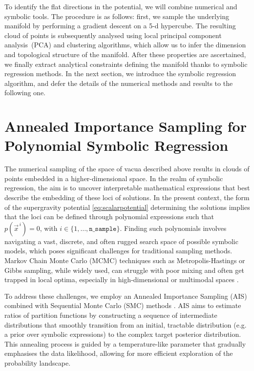 \documentclass[11pt,a4paper]{article}
\begin{document}
To identify the flat directions in the potential, we will combine numerical and symbolic tools. The procedure is as follows: first, we sample the underlying manifold by performing a gradient descent on a 5-d hypercube. The resulting cloud of points is subsequently analysed using local principal component analysis~(PCA) and clustering algorithms, which allow us to infer the dimension and topological structure of the manifold. After these properties are ascertained, we finally extract analytical constraints defining the manifold thanks to symbolic regression methods. In the next section, we introduce the symbolic regression algorithm, and defer the details of the numerical methods and results to the following one.


\section{Annealed Importance Sampling for Polynomial Symbolic Regression} \label{Sec:AIS-SMC}
	

The numerical sampling of the space of vacua described above results in clouds of points embedded in a higher-dimensional space. 
In the realm of symbolic regression, the aim is to uncover interpretable mathematical expressions that best describe the embedding of these loci of solutions. 
In the present context, the form of the supergravity potential \eqref{eq:scalarpotential} determining the solutions implies that the loci can be defined through polynomial expressions such that $p(\vec{x}^{\,i}) = 0$, with $i \in \{1, \dots, \texttt{n\_{sample}}\}$. 
Finding such polynomials involves navigating a vast, discrete, and often rugged search space of possible symbolic models, which poses significant challenges for traditional sampling methods. 
Markov Chain Monte Carlo (MCMC) techniques such as Metropolis-Hastings or Gibbs sampling, while widely used, can struggle with poor mixing and often get trapped in local optima, especially in high-dimensional or multimodal spaces \cite{??}.

To address these challenges, we employ an Annealed Importance Sampling (AIS) \cite{neal1998annealedimportancesampling} combined with Sequential Monte Carlo (SMC) methods \cite{naesseth2024elementssequentialmontecarlo}. 
AIS aims to estimate ratios of partition functions by constructing a sequence of intermediate distributions that smoothly transition from an initial, tractable distribution (e.g. a prior over symbolic expressions) to the complex target posterior distribution. This annealing process is guided by a temperature-like parameter that gradually emphasises the data likelihood, allowing for more efficient exploration of the probability landscape. 
\end{document}
